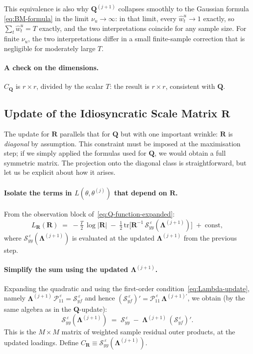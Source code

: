 \documentclass[11pt, a4paper, oneside]{article}
\newcommand{\mL}{\boldsymbol{\Lambda}}
\newcommand{\mR}{\mathbf{R}}
\newcommand{\mQ}{\mathbf{Q}}
\begin{document}
This equivalence is also why $\mQ^{(j+1)}$ collapses smoothly to the
Gaussian formula \eqref{eq:BM-formula} in the limit $\nu_u \to \infty$:
in that limit, every $\hat{w}^u_t \to 1$ exactly, so $\sum_t \hat{w}^u_t = T$
exactly, and the two interpretations coincide for any sample size.
For finite $\nu_u$, the two interpretations differ in a small
finite-sample correction that is negligible for moderately large $T$.

\paragraph{A check on the dimensions.}
$C_{\mQ}$ is $r \times r$, divided by the scalar $T$: the result is
$r \times r$, consistent with $\mQ$.

\subsection{Update of the Idiosyncratic Scale Matrix $\mathbf{R}$}
\label{subsec:update-R}

The update for $\mR$ parallels that for $\mQ$ but with one important
wrinkle: $\mR$ is \emph{diagonal} by assumption. This constraint must
be imposed at the maximisation step; if we simply applied the formulas
used for $\mQ$, we would obtain a full symmetric matrix. The
projection onto the diagonal class is straightforward, but let us be
explicit about how it arises.

\paragraph{Isolate the terms in $L(\theta, \theta^{(j)})$ that depend on $\mathbf{R}$.}
From the observation block of~\eqref{eq:Q-function-expanded}:
\begin{equation}
L_{\mR}(\mR) \;=\; -\tfrac{T}{2}\,\log|\mR| \;-\; \tfrac{1}{2}\,\mathrm{tr}\!\Big[\mR^{-1}\, \mathcal{S}_{yy}^{\,\varepsilon}(\mL^{(j+1)})\Big]
\;+\; \text{const},
\label{eq:L-R-step1}
\end{equation}
where $\mathcal{S}_{yy}^{\,\varepsilon}(\mL^{(j+1)})$ is
evaluated at the updated $\mL^{(j+1)}$ from the previous
step.

\paragraph{Simplify the sum using the updated $\mL^{(j+1)}$.}
Expanding the quadratic and using the first-order
condition~\eqref{eq:Lambda-update}, namely
$\mL^{(j+1)}\, \mathcal{P}_{11}^{\,\varepsilon} = \mathcal{S}_{yf}^{\,\varepsilon}$
and hence $(\mathcal{S}_{yf}^{\,\varepsilon})' = \mathcal{P}_{11}^{\,\varepsilon}\, \mL^{(j+1)\prime}$,
we obtain (by the same algebra as in the $\mQ$-update):
\begin{equation}
\mathcal{S}_{yy}^{\,\varepsilon}(\mL^{(j+1)}) \;=\; \mathcal{S}_{yy}^{\,\varepsilon} \;-\; \mL^{(j+1)}\, (\mathcal{S}_{yf}^{\,\varepsilon})'.
\label{eq:Syy-simplified}
\end{equation}
This is the $M \times M$ matrix of weighted sample residual outer
products, at the updated loadings. Define $C_{\mR} \equiv \mathcal{S}_{yy}^{\,\varepsilon}(\mL^{(j+1)})$.
\end{document}
